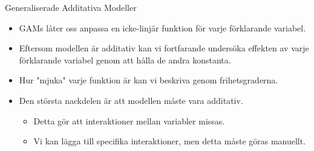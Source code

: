 \documentclass[10pt,english]{beamer}
\begin{document}
\begin{frame}{Generaliserade Additativa Modeller}
    
    \begin{itemize}
        \item GAMs låter oss anpassa en icke-linjär funktion för varje förklarande variabel.
        \item Eftersom modellen är additativ kan vi fortfarande undersöka effekten av varje förklarande variabel genom att hålla de andra konstanta.
        \item Hur "mjuka" varje funktion är kan vi beskriva genom frihetsgraderna. 
        \item Den största nackdelen är att modellen måste vara additativ.
        \begin{itemize}
            \item Detta gör att interaktioner mellan variabler missas.
            \item Vi kan lägga till specifika interaktioner, men detta måste göras manuellt.
        \end{itemize}
    \end{itemize}

\end{frame}
\end{document}
